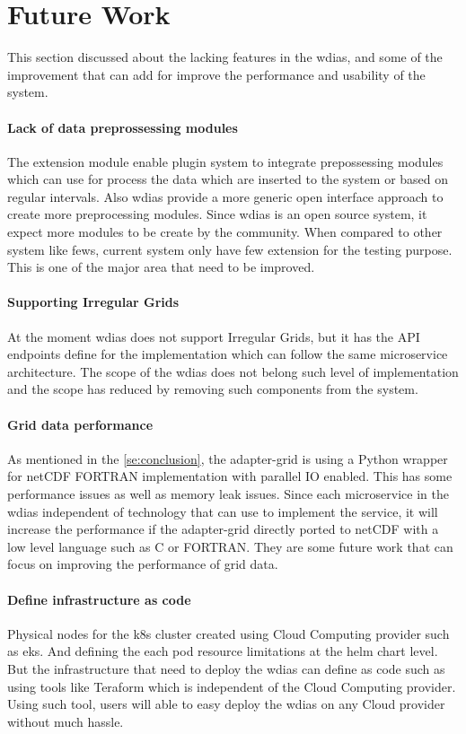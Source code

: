 \section{Future Work}
This section discussed about the lacking features in the \acrshort{wdias}, and some of the improvement that can add for improve the performance and usability of the system.

\paragraph{Lack of data preprossessing modules}
The extension module enable plugin system to integrate prepossessing modules which can use for process the data which are inserted to the system or based on regular intervals. Also \acrshort{wdias} provide a more generic open interface approach to create more preprocessing modules. Since \acrshort{wdias} is an open source system, it expect more modules to be create by the community. When compared to other system like \acrshort{fews}, current system only have few extension for the testing purpose. This is one of the major area that need to be improved.

\paragraph{Supporting Irregular Grids}
At the moment \acrshort{wdias} does not support Irregular Grids, but it has the API endpoints define for the implementation which can follow the same microservice architecture. The scope of the \acrshort{wdias} does not belong such level of implementation and the scope has reduced by removing such components from the system.

\paragraph{Grid data performance}
As mentioned in the \ref{se:conclusion}, the adapter-grid is using a Python wrapper for netCDF FORTRAN implementation with parallel IO enabled. This has some performance issues as well as memory leak issues. Since each microservice in the \acrshort{wdias} independent of technology that can use to implement the service, it will increase the performance if the adapter-grid directly ported to netCDF with a low level language such as C or FORTRAN. They are some future work that can focus on improving the performance of grid data.

\paragraph{Define infrastructure as code}
Physical nodes for the \acrshort{k8s} cluster created using Cloud Computing provider such as \acrshort{eks}. And defining the each pod resource limitations at the helm chart level. But the infrastructure that need to deploy the \acrshort{wdias} can define as code such as using tools like Teraform which is independent of the Cloud Computing provider. Using such tool, users will able to easy deploy the \acrshort{wdias} on any Cloud provider without much hassle.

